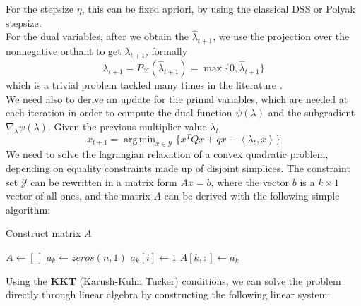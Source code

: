 \documentclass[notitlepage]{article}
\DeclareMathOperator*{\argmin}{arg\,min}
\begin{document}
For the stepsize $\eta$, this can be fixed apriori, by using the classical DSS or Polyak stepsize.\\
For the dual variables, after we obtain the $\hat{\lambda}_{t+1}$, we use the projection over the nonnegative orthant to get $\lambda_{t+1}$, formally
\[
  \lambda_{t+1} = P_\mathcal{X}(\hat{\lambda}_{t+1}) = \max{ \{ 0,\hat{\lambda}_{t+1} \} }
\]
which is a trivial problem tackled many times in the literature \cite{nonnegative-orthant}.\\
We need also to derive an update for the primal variables, which are needed at each iteration in order to compute the dual function $\psi( \lambda )$ and the subgradient $\nabla_\lambda \psi( \lambda )$. Given the previous multiplier value $\lambda_t$
\[
  x_{t+1} = \argmin_{x \in \mathcal{Y}} \{ x^T Q x + q x - \left\langle \lambda_t,x \right\rangle \}
\]
We need to solve the lagrangian relaxation of a convex quadratic problem, depending on equality constraints made up of disjoint simplices. The constraint set $\mathcal{Y}$ can be rewritten in a matrix form $Ax = b$, where the vector $b$ is a $k \times 1$ vector of all ones, and the matrix $A$
can be derived with the following simple algorithm:
\begin{algorithm}[H]
  \caption{Construct matrix $A$}
  \begin{algorithmic}
      \State $A \gets \left[\,\right]$
        \State $a_k \gets zeros(n,1)$
            \State $a_k[i] \gets 1$
          \EndIf
        \EndFor
        \State $A[k,:] \gets a_k$
      \EndFor
    \EndProcedure
  \end{algorithmic}
\end{algorithm}
Using the {\bf KKT} (Karush-Kuhn Tucker) conditions, we can solve the problem directly through linear algebra by constructing the following linear system:
\end{document}
